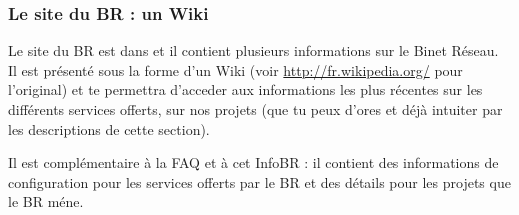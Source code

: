 
\subsubsection{Le site du BR : un Wiki}
\label{siteBR}

Le site du BR est dans  et il contient plusieurs
informations sur le Binet R\'eseau.
Il est pr\'esent\'e sous la forme d'un Wiki (voir \url{http://fr.wikipedia.org/} pour l'original)
et te permettra d'acceder aux informations les plus r\'ecentes sur les diff\'erents services offerts,
sur nos projets (que tu peux d'ores et d\'ej\`a intuiter par les descriptions de cette section).

Il est compl\'ementaire \`a la {\sc FAQ} et \`a cet InfoBR : il contient des informations
de configuration pour les services offerts par le BR et des d\'etails pour les projets que
le BR m\'ene.


